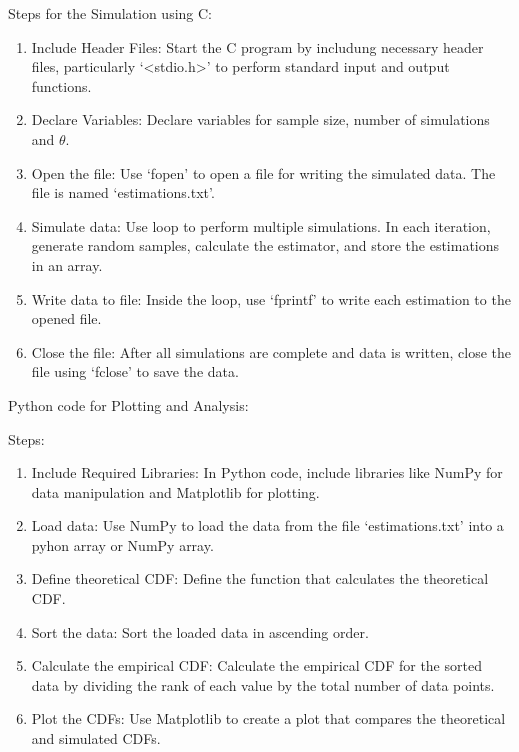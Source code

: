 \documentclass{article}[]
\begin{document}
Steps for the Simulation using C: 
\begin{enumerate}
\item Include Header Files: Start the C program by includung necessary header files, particularly `<stdio.h>' to perform standard input and output functions.
\item Declare Variables: Declare variables for sample size, number of simulations and $\theta$.
\item Open the file: Use `fopen' to open a file for writing the simulated data. The file is named `estimations.txt'.
\item Simulate data: Use loop to perform multiple simulations. In each iteration, generate random samples, calculate the estimator, and store the estimations in an array.
\item Write data to file: Inside the loop, use `fprintf' to write each estimation to the opened file.
\item Close the file: After all simulations are complete and data is written, close the file using `fclose' to save the data.
\end{enumerate}

Python code for Plotting and Analysis:

Steps: 
\begin{enumerate}
\item Include Required Libraries: In Python code, include libraries like NumPy for data manipulation and Matplotlib for plotting.
\item Load data: Use NumPy to load the data from the file `estimations.txt' into a pyhon array or NumPy array.
\item Define theoretical CDF: Define the function that calculates the theoretical CDF.
\item Sort the data: Sort the loaded data in ascending order.
\item Calculate the empirical CDF: Calculate the empirical CDF for the sorted data by dividing the rank of each value by the total number of data points.
\item Plot the CDFs: Use Matplotlib to create a plot that compares the theoretical and simulated CDFs.
\end{enumerate}
\end{document}
